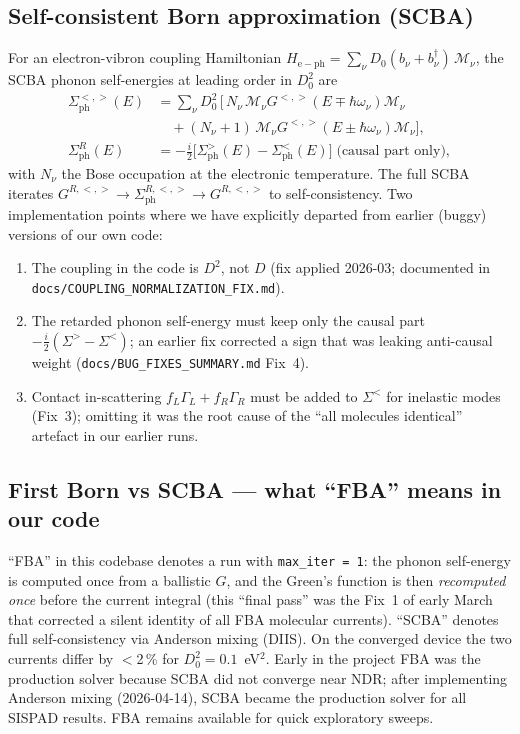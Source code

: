 \documentclass[11pt,a4paper,onecolumn]{article}
\newcommand{\code}[1]{\texttt{\small #1}}
\begin{document}
\subsection{Self-consistent Born approximation (SCBA)}
For an electron-vibron coupling Hamiltonian
$H_{\mathrm{e-ph}} = \sum_\nu D_0 (b_\nu + b_\nu^\dagger)\,\mathcal M_\nu$,
the SCBA phonon self-energies at leading order in $D_0^2$ are
\begin{align}
\Sigma^{<,>}_{\mathrm{ph}}(E) &= \sum_\nu D_0^2\,\bigl[
\, N_\nu\,\mathcal M_\nu G^{<,>}(E \mp \hbar\omega_\nu)\mathcal M_\nu \nonumber\\
&\quad + (N_\nu + 1)\,\mathcal M_\nu G^{<,>}(E \pm \hbar\omega_\nu)\mathcal M_\nu
\bigr],\\
\Sigma^{R}_{\mathrm{ph}}(E) &= -\tfrac{i}{2}\bigl[\Sigma^{>}_{\mathrm{ph}}(E)
- \Sigma^{<}_{\mathrm{ph}}(E)\bigr]\;\text{(causal part only)},
\end{align}
with $N_\nu$ the Bose occupation at the electronic temperature. The full
SCBA iterates $G^{R,<,>} \to \Sigma^{R,<,>}_{\mathrm{ph}} \to G^{R,<,>}$
to self-consistency. Two implementation points where we have explicitly
departed from earlier (buggy) versions of our own code:
\begin{enumerate}[leftmargin=1.3em,itemsep=0pt]
\item The coupling in the code is $D^2$, not $D$ (fix applied 2026-03;
documented in \code{docs/COUPLING\_NORMALIZATION\_FIX.md}).
\item The retarded phonon self-energy must keep only the causal part
$-\tfrac{i}{2}(\Sigma^{>}-\Sigma^{<})$; an earlier fix corrected a sign
that was leaking anti-causal weight (\code{docs/BUG\_FIXES\_SUMMARY.md}
Fix~4).
\item Contact in-scattering $f_L\Gamma_L + f_R\Gamma_R$ must be added to
$\Sigma^{<}$ for inelastic modes (Fix~3); omitting it was the root cause
of the ``all molecules identical'' artefact in our earlier runs.
\end{enumerate}

\subsection{First Born vs SCBA --- what ``FBA'' means in our code}
``FBA'' in this codebase denotes a run with \code{max\_iter = 1}: the
phonon self-energy is computed once from a ballistic $G$, and the Green's
function is then \emph{recomputed once} before the current integral
(this ``final pass'' was the Fix~1 of early March that corrected a silent
identity of all FBA molecular currents). ``SCBA'' denotes full
self-consistency via Anderson mixing (DIIS). On the converged device the
two currents differ by $<$2\,\% for $D_0^2 = 0.1$~eV$^2$. Early in
the project FBA was the production solver because SCBA did not converge
near NDR; after implementing Anderson mixing (2026-04-14), SCBA became
the production solver for all SISPAD results. FBA remains available for
quick exploratory sweeps.
\end{document}
